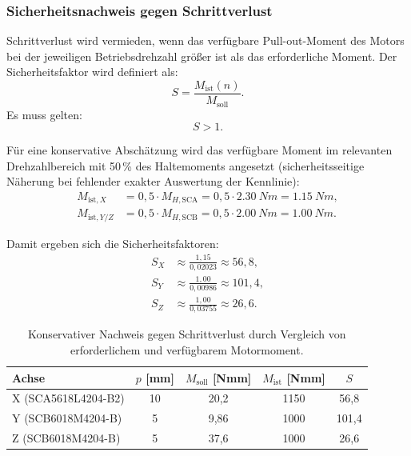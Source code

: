 \subsubsection{Sicherheitsnachweis gegen Schrittverlust}

Schrittverlust wird vermieden, wenn das verfügbare Pull-out-Moment des Motors bei der jeweiligen Betriebsdrehzahl größer ist als das erforderliche Moment. Der Sicherheitsfaktor wird definiert als:
\begin{equation}
S=\frac{M_\text{ist}(n)}{M_\text{soll}}.
\end{equation}
Es muss gelten:
\begin{equation}
S>1.
\end{equation}

Für eine konservative Abschätzung wird das verfügbare Moment im relevanten Drehzahlbereich mit \num{50}\,\% des Haltemoments angesetzt (sicherheitsseitige Näherung bei fehlender exakter Auswertung der Kennlinie):
\begin{align}
M_{\text{ist},X} &= 0,5\cdot M_{H,\text{SCA}} = 0,5\cdot \SI{2,30}{Nm}=\SI{1,15}{Nm},\\
M_{\text{ist},Y/Z} &= 0,5\cdot M_{H,\text{SCB}} = 0,5\cdot \SI{2,00}{Nm}=\SI{1,00}{Nm}.
\end{align}

Damit ergeben sich die Sicherheitsfaktoren:
\begin{align}
S_X &\approx \frac{1,15}{0,02023} \approx 56,8,\\
S_Y &\approx \frac{1,00}{0,00986} \approx 101,4,\\
S_Z &\approx \frac{1,00}{0,03755} \approx 26,6.
\end{align}

\begin{table}[H]
\centering
\small
\setlength{\tabcolsep}{5pt}
\renewcommand{\arraystretch}{1.2}
\begin{tabular}{|l|c|c|c|c|}
\hline
\textbf{Achse} & $p$ [mm] & $M_\text{soll}$ [Nmm] & $M_\text{ist}$ [Nmm] & $S$ \\
\hline
X (SCA5618L4204-B2) & 10 & 20,2 & 1150 & 56,8 \\
\hline
Y (SCB6018M4204-B)  & 5  & 9,86 & 1000 & 101,4 \\
\hline
Z (SCB6018M4204-B)  & 5  & 37,6 & 1000 & 26,6 \\
\hline
\end{tabular}
\caption{Konservativer Nachweis gegen Schrittverlust durch Vergleich von erforderlichem und verfügbarem Motormoment.}
\label{tab:schrittverlust_nachweis}
\end{table}

